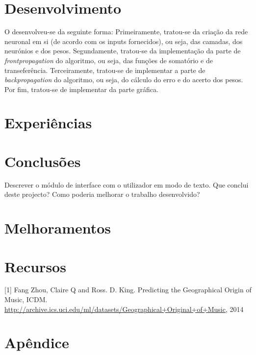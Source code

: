 \documentclass[a4paper]{article}
\begin{document}
\section{Desenvolvimento}

O desenvolveu-se da seguinte forma: \linebreak
Primeiramente, tratou-se da criação da rede neuronal em si (de acordo com os inputs fornecidos), ou seja, das camadas, dos neurónios e dos pesos.\linebreak
Segundamente, tratou-se da implementação da parte de \textit{frontpropagation} do algoritmo, ou seja, das funções de somatório e de transeferência.\linebreak
Terceiramente, tratou-se de implementar a parte de \textit{backpropagation} do algoritmo, ou seja, do cálculo do erro e do acerto dos pesos.\linebreak
Por fim, tratou-se de implementar da parte gráfica.

\section{Experiências}




\section{Conclusões}

Descrever o módulo de interface com o utilizador em modo de texto.
Que conclui deste projecto? Como poderia melhorar o trabalho desenvolvido?



\section{Melhoramentos}



\section{Recursos}

[1] Fang Zhou, Claire Q and Ross. D. King. Predicting the Geographical Origin of Music, ICDM.
\url{http://archive.ics.uci.edu/ml/datasets/Geographical+Original+of+Music}, 2014

\clearpage


\section{Apêndice}
\end{document}
